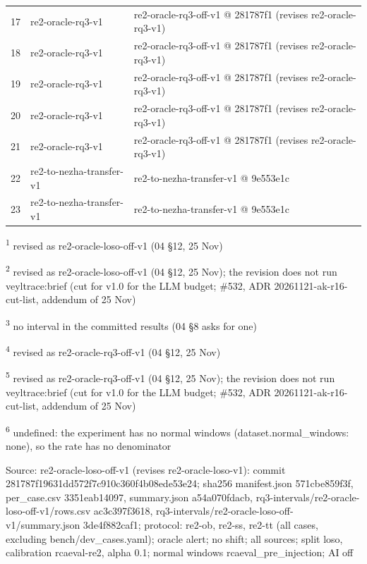\begin{longtable}{@{}r>{\raggedright\arraybackslash}p{72.0pt}>{\raggedright\arraybackslash}p{108.0pt}@{}}
17 & re2-oracle-rq3-v1 & re2-oracle-rq3-off-v1 @ 281787f1 (revises re2-oracle-rq3-v1) \\
18 & re2-oracle-rq3-v1 & re2-oracle-rq3-off-v1 @ 281787f1 (revises re2-oracle-rq3-v1) \\
19 & re2-oracle-rq3-v1 & re2-oracle-rq3-off-v1 @ 281787f1 (revises re2-oracle-rq3-v1) \\
20 & re2-oracle-rq3-v1 & re2-oracle-rq3-off-v1 @ 281787f1 (revises re2-oracle-rq3-v1) \\
21 & re2-oracle-rq3-v1 & re2-oracle-rq3-off-v1 @ 281787f1 (revises re2-oracle-rq3-v1) \\
22 & re2-to-nezha-transfer-v1 & re2-to-nezha-transfer-v1 @ 9e553e1c \\
23 & re2-to-nezha-transfer-v1 & re2-to-nezha-transfer-v1 @ 9e553e1c \\
\end{longtable}
\par\raggedright\noindent
\textsuperscript{1} revised as re2-oracle-loso-off-v1 (04 \S{}12, 25 Nov)\par
\textsuperscript{2} revised as re2-oracle-loso-off-v1 (04 \S{}12, 25 Nov); the revision does not run veyltrace:brief (cut for v1.0 for the LLM budget; \#532, ADR 20261121-ak-r16-cut-list, addendum of 25 Nov)\par
\textsuperscript{3} no interval in the committed results (04 \S{}8 asks for one)\par
\textsuperscript{4} revised as re2-oracle-rq3-off-v1 (04 \S{}12, 25 Nov)\par
\textsuperscript{5} revised as re2-oracle-rq3-off-v1 (04 \S{}12, 25 Nov); the revision does not run veyltrace:brief (cut for v1.0 for the LLM budget; \#532, ADR 20261121-ak-r16-cut-list, addendum of 25 Nov)\par
\textsuperscript{6} undefined: the experiment has no normal windows (dataset.normal\_windows: none), so the rate has no denominator\par
\noindent Source: re2-oracle-loso-off-v1 (revises re2-oracle-loso-v1): commit 281787f19631dd572f7c910c360f4b08ede53e24; sha256 manifest.json 571cbe859f3f, per\_case.csv 3351eab14097, summary.json a54a070fdacb, rq3-intervals/\allowbreak{}re2-oracle-loso-off-v1/\allowbreak{}rows.csv ac3c397f3618, rq3-intervals/\allowbreak{}re2-oracle-loso-off-v1/\allowbreak{}summary.json 3de4f882caf1; protocol: re2-ob, re2-ss, re2-tt (all cases, excluding bench/\allowbreak{}dev\_cases.yaml); oracle alert; no shift; all sources; split loso, calibration rcaeval-re2, alpha 0.1; normal windows rcaeval\_pre\_injection; AI off\par
